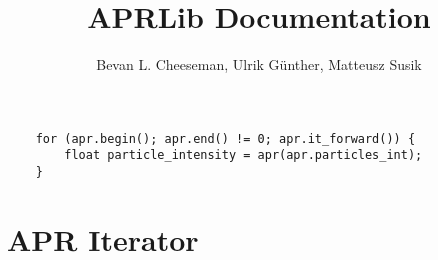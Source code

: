 \documentclass[12pt]{article}
\title{APRLib Documentation}
\author
{Bevan L. Cheeseman, Ulrik G{\"u}nther, Matteusz Susik}
\begin{document}
\maketitle

\begin{lstlisting}
	for (apr.begin(); apr.end() != 0; apr.it_forward()) {
		float particle_intensity = apr(apr.particles_int);
	}
\end{lstlisting}

\section{APR Iterator}
\end{document}
